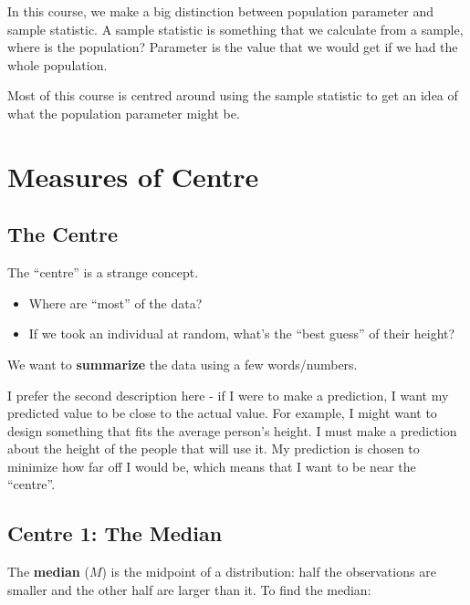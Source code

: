 \documentclass[
  letterpaper,
  DIV=11,
  numbers=noendperiod]{scrreprt}
\providecommand{\tightlist}{%
  \setlength{\itemsep}{0pt}\setlength{\parskip}{0pt}}\usepackage{longtable,booktabs,array}
\begin{document}
In this course, we make a big distinction between population parameter
and sample statistic. A sample statistic is something that we calculate
from a sample, where is the population? Parameter is the value that we
would get if we had the whole population.

Most of this course is centred around using the sample statistic to get
an idea of what the population parameter might be.

\hypertarget{measures-of-centre}{%
\chapter{Measures of Centre}\label{measures-of-centre}}

\hypertarget{the-centre}{%
\section{The Centre}\label{the-centre}}

The ``centre'' is a strange concept.

\begin{itemize}
\tightlist
\item
  Where are ``most'' of the data?\lspace
\item
  If we took an individual at random, what's the ``best guess'' of their
  height?\lspace
\end{itemize}

\pspace

We want to \textbf{summarize} the data using a few words/numbers.

I prefer the second description here - if I were to make a prediction, I
want my predicted value to be close to the actual value. For example, I
might want to design something that fits the average person's height. I
must make a prediction about the height of the people that will use it.
My prediction is chosen to minimize how far off I would be, which means
that I want to be near the ``centre''.

\hypertarget{centre-1-the-median}{%
\section{Centre 1: The Median}\label{centre-1-the-median}}

The \textbf{median} (\(M\)) is the midpoint of a distribution: half the
observations are smaller and the other half are larger than it. To find
the median: \pspace
\end{document}
